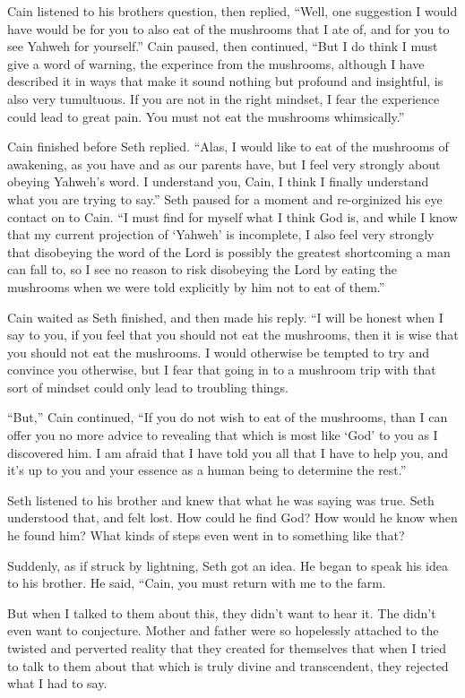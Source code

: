 \documentclass[12pt,twoside,titlepage]{report}
\begin{document}
Cain listened to his brothers question, then replied, ``Well, one
suggestion I would have would be for you to also eat of the mushrooms
that I ate of, and for you to see Yahweh for yourself.'' Cain paused,
then continued, ``But I do think I must give a word of warning, the
experince from the mushrooms, although I have described it in ways that
make it sound nothing but profound and insightful, is also very
tumultuous. If you are not in the right mindset, I fear the experience
could lead to great pain. You must not eat the mushrooms whimsically.''

Cain finished before Seth replied. ``Alas, I would like to eat of the
mushrooms of awakening, as you have and as our parents have, but I feel
very strongly about obeying Yahweh's word. I understand you, Cain, I
think I finally understand what you are trying to say.'' Seth paused for
a moment and re-orginized his eye contact on to Cain. ``I must find for
myself what I think God is, and while I know that my current projection
of `Yahweh' is incomplete, I also feel very strongly that disobeying the
word of the Lord is possibly the greatest shortcoming a man can fall to,
so I see no reason to risk disobeying the Lord by eating the mushrooms
when we were told explicitly by him not to eat of them.''

Cain waited as Seth finished, and then made his reply. ``I will be
honest when I say to you, if you feel that you should not eat the
mushrooms, then it is wise that you should not eat the mushrooms. I
would otherwise be tempted to try and convince you otherwise, but I fear
that going in to a mushroom trip with that sort of mindset could only
lead to troubling things.

``But,'' Cain continued, ``If you do not wish to eat of the mushrooms,
than I can offer you no more advice to revealing that which is most like
`God' to you as I discovered him. I am afraid that I have told you all
that I have to help you, and it's up to you and your essence as a human
being to determine the rest.''

Seth listened to his brother and knew that what he was saying was true.
Seth understood that, and felt lost. How could he find God? How would he
know when he found him? What kinds of steps even went in to something
like that?

Suddenly, as if struck by lightning, Seth got an idea. He began to speak
his idea to his brother. He said, ``Cain, you must return with me to the
farm.

But when I talked to them about this, they didn't want to hear it. The
didn't even want to conjecture. Mother and father were so hopelessly
attached to the twisted and perverted reality that they created for
themselves that when I tried to talk to them about that which is truly
divine and transcendent, they rejected what I had to say.
\end{document}
